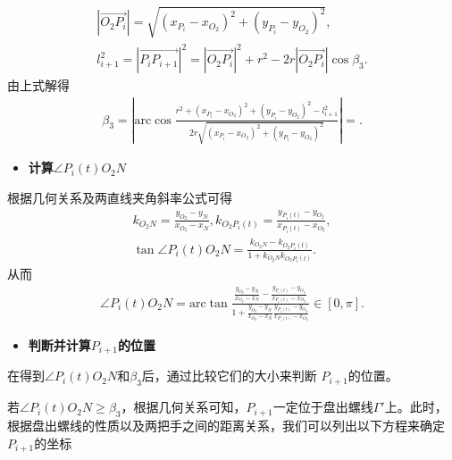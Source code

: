 \documentclass[../main.tex]{subfiles}
\begin{document}
\begin{gather}\label{1.........454}
\left| \overrightarrow{O_2P_i} \right|=\sqrt{\left( x_{P_i}-x_{O_2} \right) ^2+\left( y_{P_i}-y_{O_2} \right) ^2},
\\
l_{i+1}^{2}=\left| \overrightarrow{P_iP_{i+1}} \right|^2=\left| \overrightarrow{O_2P_i} \right|^2+r^2-2r\left| \overrightarrow{O_2P_i} \right|\cos \beta _3.
\end{gather}
由上式解得
\begin{align}\label{1.........455}
\beta _3=\left| \mathrm{arc}\cos \frac{r^2+\left( x_{P_i}-x_{O_2} \right) ^2+\left( y_{P_i}-y_{O_2} \right) ^2-l_{i+1}^{2}}{2r\sqrt{\left( x_{P_i}-x_{O_2} \right) ^2+\left( y_{P_i}-y_{O_2} \right) ^2}} \right|=.
\end{align}

\begin{itemize}
    \item \textbf{计算$\angle P_{i}(t)O_2N$}
    \end{itemize}

\par 根据几何关系及两直线夹角斜率公式可得
\begin{gather}\label{1.........456}
k_{O_2N}=\frac{y_{O_2}-y_N}{x_{O_2}-x_N},k_{O_2P_i\left( t \right)}=\frac{y_{P_i\left( t \right)}-y_{O_2}}{x_{P_i\left( t \right)}-x_{O_2}},
\\
\tan \angle P_i(t)O_2N=\frac{k_{O_2N}-k_{O_2P_i\left( t \right)}}{1+k_{O_2N}k_{O_2P_i\left( t \right)}}.
\end{gather}
从而
\begin{align}\label{1.........457}
\angle P_i(t)O_2N=\mathrm{arc}\tan \frac{\frac{y_{O_2}-y_N}{x_{O_2}-x_N}-\frac{y_{P_i\left( t \right)}-y_{O_2}}{x_{P_i\left( t \right)}-x_{O_2}}}{1+\frac{y_{O_2}-y_N}{x_{O_2}-x_N}\frac{y_{P_i\left( t \right)}-y_{O_2}}{x_{P_i\left( t \right)}-x_{O_2}}}\in \left[ 0,\pi \right] .
\end{align}
\begin{itemize}
    \item \textbf{判断并计算$P_{i+1}$的位置}
    \end{itemize}
    \par 在得到$\angle P_{i}(t)O_{2}N$和$\beta_{3}$后，通过比较它们的大小来判断 $P_{i + 1} $的位置。
 
    \par 若$\angle P_{i}(t)O_{2}N \geq \beta_{3}$，根据几何关系可知，$P_{i + 1}$一定位于盘出螺线$\Gamma'$上。此时，根据盘出螺线的性质以及两把手之间的距离关系，我们可以列出以下方程来确定$ P_{i + 1} $的坐标
\end{document}
